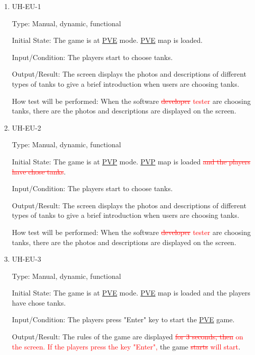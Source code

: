 \documentclass[12pt, titlepage]{article}
\begin{document}
\begin{enumerate}

\item{UH-EU-1\\}

Type: Manual, dynamic, functional
					
Initial State: The game is at \underline{PVE} mode. \underline{PVE} map is loaded.
					
Input/Condition: The players start to choose tanks.
					
Output/Result: The screen displays the photos and descriptions of different types of tanks to give a brief introduction when users are choosing tanks.
					
How test will be performed: When the software  \textcolor{red}{\sout{developer} tester} are choosing tanks, there are the photos and descriptions are displayed on the screen.

\item{UH-EU-2\\}

Type: Manual, dynamic, functional
					
Initial State: The game is at \underline{PVP} mode. \underline{PVP} map is loaded \textcolor{red}{\sout{and the players have chose tanks}}.
					
Input/Condition: The players start to choose tanks.
					
Output/Result: The screen displays the photos and descriptions of different types of tanks to give a brief introduction when users are choosing tanks.
					
How test will be performed: When the software  \textcolor{red}{\sout{developer} tester} are choosing tanks, there are the photos and descriptions are displayed on the screen.

\item{UH-EU-3\\}

Type: Manual, dynamic, functional
					
Initial State: The game is at \underline{PVE} mode. \underline{PVE} map is loaded and the players have chose tanks.
					
Input/Condition: The players press "Enter" key to start the \underline{PVE} game. 
					
Output/Result: The rules of the game are displayed \textcolor{red}{\sout{for 3 seconds, then} on the screen. If the players press the key "Enter",} the game \textcolor{red}{\sout{starts} will start}.
					

\end{enumerate}
\end{document}

